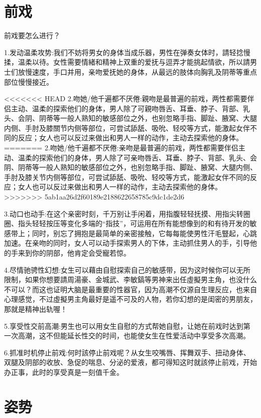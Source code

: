 \documentclass[12pt,UTF8]{ctexbook}
\begin{document}
\chapter{前戏}

前戏要怎么进行？

1.发动温柔攻势:我们不妨将男女的身体当成乐器，男性在弹奏女体时，請轻捻慢揉，温柔以待。女性需要情緒和精神上双重的爱抚与逗弄才能挑起情欲，所以請男士们放慢速度，手口并用，亲吻爱抚她的身体，从最远的肢体向胸乳及阴蒂等重点部位慢慢接近。

<<<<<<< HEAD
2.吻她/他千遍都不厌倦:親吻是最普遍的前戏，两性都需要伴侣主动、温柔的探索他们的身体，男人除了可親吻唇舌、耳垂、脖子、背部、乳头、会阴、阴蒂等一般人熟知的敏感部位之外，也别忽略手指、脚趾、腋窝、大腿内侧、手肘及膝關节内侧等部位，可尝试舔舐、吸吮、轻咬等方式，能激起女伴不同的反应；女人也可以反过来做出和男人一样的动作，主动去探索他的身体。
=======
2.吻她/他千遍都不厌倦:亲吻是最普遍的前戏，两性都需要伴侣主动、温柔的探索他们的身体，男人除了可亲吻唇舌、耳垂、脖子、背部、乳头、会阴、阴蒂等一般人熟知的敏感部位之外，也别忽略手指、脚趾、腋窝、大腿内侧、手肘及膝关节内侧等部位，可尝试舔舐、吸吮、轻咬等方式，能激起女伴不同的反应；女人也可以反过来做出和男人一样的动作，主动去探索他的身体。
>>>>>>> 5ab1aa26d2f60189e2188622658785c9dc1de2d6

3.动口也动手:在这个亲密时刻，千万别让手闲着，用指腹轻轻抚摸、用指尖转圈圈、指头轻轻按压等变化多端的“指技”，可运用在所有能想像到的和有待开发的敏感带上；同时，别忘了拥抱是最简单的亲密接触，它每每能使男性汗毛豎起，心跳加速。在亲吻的同时，女人可以动手探索男人的下体，主动抓住男人的手，引导他的手来到你的阴部，他肯定会受寵若惊。

4.尽情驰骋性幻想:女生可以藉由自慰探索自己的敏感带，因为这时候你可以无所限制，如果你想要請周湯豪、金城武、李敏鎬等男神来出任虛擬男主角，也没什么不可以？而这也证明大脑是最重要的性器官，因为高潮不仅源自生理反应，也来自心理感觉，不过虛擬男主角最好是遥不可及的人物，若你幻想的是闺密的男朋友，那就是精神出轨喔！

5.享受性交前高潮:男生也可以用女生自慰的方式帮她自慰，让她在前戏时达到第一次高潮，这不但能延长性交的时间，也能使女生在性爱活动中享受多次高潮。

6.抓准时机停止前戏:何时該停止前戏呢？从女生咬嘴唇、挥舞双手、扭动身体、双腿及阴部的收放、急促的喘息、分泌的爱液，都可得知这时就該停止前戏，开始办正事，此时的享受真是一刻值千金。


\chapter{姿势}
\end{document}
